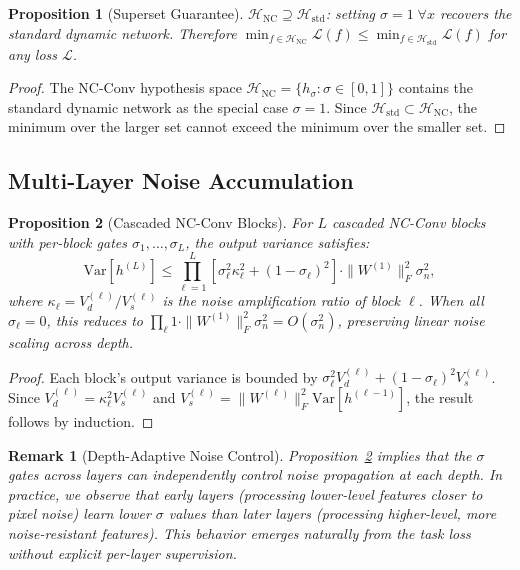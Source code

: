 \documentclass[journal]{IEEEtran}
\newtheorem{proposition}{Proposition}
\newtheorem{remark}{Remark}
\begin{document}
\begin{proposition}[Superset Guarantee]
\label{prop:superset}
$\mathcal{H}_{\text{NC}} \supseteq \mathcal{H}_{\text{std}}$: setting $\sigma=1\;\forall x$ recovers the standard dynamic network.
Therefore $\min_{f \in \mathcal{H}_{\text{NC}}} \mathcal{L}(f) \leq \min_{f \in \mathcal{H}_{\text{std}}} \mathcal{L}(f)$ for any loss $\mathcal{L}$.
\end{proposition}

\begin{proof}
The NC-Conv hypothesis space $\mathcal{H}_{\text{NC}} = \{h_\sigma : \sigma \in [0,1]\}$ contains the standard dynamic network as the special case $\sigma = 1$.
Since $\mathcal{H}_{\text{std}} \subset \mathcal{H}_{\text{NC}}$, the minimum over the larger set cannot exceed the minimum over the smaller set.
\end{proof}

\subsection{Multi-Layer Noise Accumulation}

\begin{proposition}[Cascaded NC-Conv Blocks]
\label{prop:cascade}
For $L$ cascaded NC-Conv blocks with per-block gates $\sigma_1, \ldots, \sigma_L$, the output variance satisfies:
\begin{equation}
\text{Var}[h^{(L)}] \leq \prod_{\ell=1}^L \left[\sigma_\ell^2 \kappa_\ell^2 + (1{-}\sigma_\ell)^2\right] \cdot \|W^{(1)}\|_F^2 \sigma_n^2,
\end{equation}
where $\kappa_\ell = V_{d}^{(\ell)} / V_{s}^{(\ell)}$ is the noise amplification ratio of block $\ell$.
When all $\sigma_\ell = 0$, this reduces to $\prod_\ell 1 \cdot \|W^{(1)}\|_F^2 \sigma_n^2 = O(\sigma_n^2)$, preserving linear noise scaling across depth.
\end{proposition}

\begin{proof}
Each block's output variance is bounded by $\sigma_\ell^2 V_d^{(\ell)} + (1{-}\sigma_\ell)^2 V_s^{(\ell)}$.
Since $V_d^{(\ell)} = \kappa_\ell^2 V_s^{(\ell)}$ and $V_s^{(\ell)} = \|W^{(\ell)}\|_F^2 \text{Var}[h^{(\ell-1)}]$, the result follows by induction.
\end{proof}

\begin{remark}[Depth-Adaptive Noise Control]
\label{rem:depth}
Proposition~\ref{prop:cascade} implies that the $\sigma$ gates across layers can independently control noise propagation at each depth.
In practice, we observe that early layers (processing lower-level features closer to pixel noise) learn lower $\sigma$ values than later layers (processing higher-level, more noise-resistant features).
This behavior emerges naturally from the task loss without explicit per-layer supervision.
\end{remark}
\end{document}
